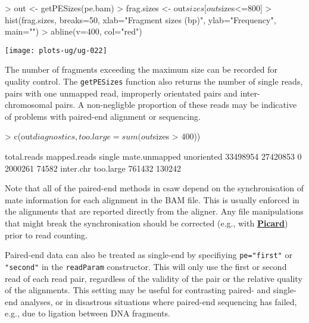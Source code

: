 \documentclass[12pt]{report}
\renewenvironment{Schunk}{\vspace{0pt}}{\vspace{0pt}}
\newcommand{\pkgname}{csaw}
\newcommand{\code}[1]{{\small\texttt{#1}}}
\begin{document}
\begin{Schunk}
\begin{Sinput}
> out <- getPESizes(pe.bam)
> frag.sizes <- out$sizes[out$sizes<=800]
> hist(frag.sizes, breaks=50, xlab="Fragment sizes (bp)", ylab="Frequency", main="")
> abline(v=400, col="red")
\end{Sinput}
\end{Schunk}

\begin{center}
\texttt{[image: plots-ug/ug-022]}
\end{center}

The number of fragments exceeding the maximum size can be recorded for quality control. 
The \code{getPESizes} function also returns the number of single reads, pairs with one unmapped read, improperly orientated pairs and inter-chromosomal pairs.
A non-negligble proportion of these reads may be indicative of problems with paired-end alignment or sequencing. 

\begin{Schunk}
\begin{Sinput}
> c(out$diagnostics, too.large=sum(out$sizes > 400))
\end{Sinput}
\begin{Soutput}
  total.reads  mapped.reads        single mate.unmapped    unoriented 
     33498954      27420853             0       2000261         74582 
    inter.chr     too.large 
       761432        130242 
\end{Soutput}
\end{Schunk}

Note that all of the paired-end methods in \pkgname{} depend on the synchronisation of mate information for each alignment in the BAM file. 
This is usually enforced in the alignments that are reported directly from the aligner. 
Any file manipulations that might break the synchronisation should be corrected (e.g., with \href{http://broadinstitute.github.io/picard}{\textbf{Picard}}) prior to read counting.

Paired-end data can also be treated as single-end by specifiying \code{pe="first"} or \code{"second"} in the \code{readParam} constructor. 
This will only use the first or second read of each read pair, regardless of the validity of the pair or the relative quality of the alignments.
This setting may be useful for contrasting paired- and single-end analyses, or in disastrous situations where paired-end sequencing has failed, e.g., due to ligation between DNA fragments.
\end{document}
